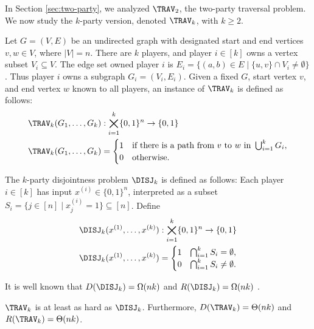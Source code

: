 In Section \ref{sec:two-party}, we analyzed $\TRAV_2$, the two-party traversal problem. We now study the $k$-party version, denoted $\TRAV_k$, with $k \geq 2$.

\begin{definition}
\label{def:multi-party-trav}
Let $G=(V,E)$ be an undirected graph with designated start and end vertices $v,w \in V$, where $|V|=n$. There are $k$ players, and player $i \in [k]$ owns a vertex subset $V_i \subseteq V$. The edge set owned player $i$ is $E_i = \{(a,b) \in E \mid \{u,v\} \cap V_i \neq \emptyset\}$. Thus player $i$ owns a subgraph $G_i = (V_i,E_i)$. Given a fixed $G$, start vertex $v$, and end vertex $w$ known to all players, an instance of $\TRAV_k$ is defined as follows:
\begin{align}
\TRAV_k(G_1,\ldots,G_k) &: \bigtimes_{i=1}^k \{0,1\}^n \to \{0,1\} \\
\TRAV_k(G_1,\ldots,G_k) &=
\begin{cases}
1 & \text{if there is a path from } v \text{ to } w \text{ in } \bigcup_{i=1}^k G_i,\\
0 & \text{otherwise.}
\end{cases}
\end{align}
\end{definition}

\begin{definition}
\label{def:k-party-disj}
The $k$-party disjointness problem $\DISJ_k$ is defined as follows: Each player $i\in[k]$ has input $x^{(i)}\in\{0,1\}^n$, interpreted as a subset $S_i = \{j\in[n] \mid x^{(i)}_j=1\} \subseteq [n]$. Define
\begin{align}
\DISJ_k(x^{(1)},\ldots,x^{(k)}) &: \bigtimes_{i=1}^k \{0,1\}^n \to \{0,1\} \\
\DISJ_k(x^{(1)},\ldots,x^{(k)}) &=
\begin{cases}
1 & \bigcap_{i=1}^k S_i=\emptyset, \\
0 & \bigcap_{i=1}^k S_i\neq\emptyset.
\end{cases}
\end{align}
\end{definition}

It is well known that $D(\DISJ_k) = \Omega(nk)$ and $R(\DISJ_k) = \Omega(nk)$ \parencite{MultipartyDisjointness}.

\begin{claim}
\label{claim:k-party-disj-to-trav}
$\TRAV_k$ is at least as hard as $\DISJ_k$. Furthermore, $D(\TRAV_k) = \Theta(nk)$ and $R(\TRAV_k) = \Theta(nk)$.
\end{claim}

